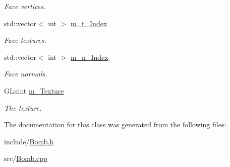 \begin{DoxyCompactItemize}
\begin{DoxyCompactList}\small\item\em Face vertices. \end{DoxyCompactList}\item 
\hypertarget{classBomb_a6a3016e2d6a0e5080ba8e920a3b65643}{std\-::vector$<$ int $>$ \hyperlink{classBomb_a6a3016e2d6a0e5080ba8e920a3b65643}{m\-\_\-t\-\_\-\-Index}}\label{classBomb_a6a3016e2d6a0e5080ba8e920a3b65643}

\begin{DoxyCompactList}\small\item\em Face textures. \end{DoxyCompactList}\item 
\hypertarget{classBomb_ae9416b2cf90b9754cf5bd4439d257f2c}{std\-::vector$<$ int $>$ \hyperlink{classBomb_ae9416b2cf90b9754cf5bd4439d257f2c}{m\-\_\-n\-\_\-\-Index}}\label{classBomb_ae9416b2cf90b9754cf5bd4439d257f2c}

\begin{DoxyCompactList}\small\item\em Face normals. \end{DoxyCompactList}\item 
\hypertarget{classBomb_abce9636838ef49c269c74bbb121c7817}{G\-Luint \hyperlink{classBomb_abce9636838ef49c269c74bbb121c7817}{m\-\_\-\-Texture}}\label{classBomb_abce9636838ef49c269c74bbb121c7817}

\begin{DoxyCompactList}\small\item\em The texture. \end{DoxyCompactList}\end{DoxyCompactItemize}


The documentation for this class was generated from the following files\-:\begin{DoxyCompactItemize}
\item 
include/\hyperlink{Bomb_8h}{Bomb.\-h}\item 
src/\hyperlink{Bomb_8cpp}{Bomb.\-cpp}\end{DoxyCompactItemize}
